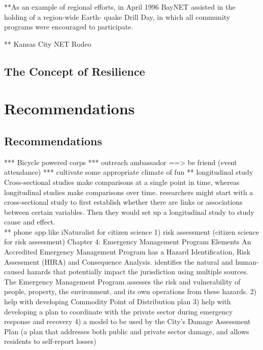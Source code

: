 \documentclass[11pt,fleqn]{book} %
\begin{document}
**As an example of regional efforts, in April 1996
BayNET assisted in the holding of a region-wide Earth-
quake Drill Day, in which all community programs were
encouraged to participate.

** Kansas City NET Rodeo





\vspace{2em}
\section{The Concept of Resilience}
\vspace{1em}





\chapter{Recommendations}

\section{Recommendations}

*** Bicycle powered corps
*** outreach ambassador ==> be friend (event attendance)
*** cultivate some appropriate climate of fun \autocite{karl_give_2008}
** longitudinal study Cross-sectional studies make comparisons at a single point in time, whereas longitudinal studies make comparisons over time. researchers might start with a cross-sectional study to first establish whether there are links or associations between certain variables. Then they would set up a longitudinal study to study cause and effect.\\
** phone app like iNaturalist for citizen science
1) risk assessment (citizen science for risk assessment)
Chapter 4: Emergency Management Program Elements
An Accredited Emergency Management Program has a Hazard Identification, Risk Assessment (HIRA)
and Consequence Analysis.
identifies the natural and human-caused hazards
that potentially impact the jurisdiction using multiple sources. The Emergency Management
Program assesses the risk and vulnerability of people, property, the environment, and its own
operations from these hazards.
2) help with developing Commodity Point of Distribution plan
3) help with developing a plan to coordinate with the private sector during emergency response and recovery
4) a model to be used by the City’s Damage Assessment Plan (a plan that addresses both public and private sector damage, and allows
residents to self-report losses)
\end{document}
